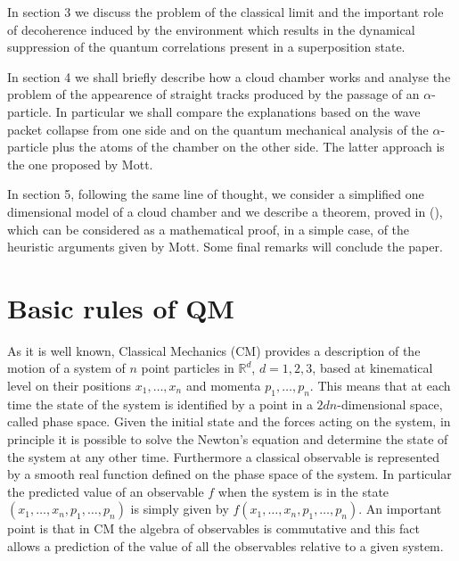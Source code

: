 \documentclass[12pt,reqno]{amsart}
\newcommand{\erre}{\mathbb{R}}
\newcommand{\n}{\relax}
\newcommand{\vs}{\medskip}
\numberwithin{equation}{section}
\begin{document}
\n
In section 3 we  discuss the problem of the classical limit and the important role of decoherence induced by the environment which results in the dynamical suppression of the quantum correlations present in a  superposition state.

\n
In section 4 we shall briefly describe how a cloud chamber works and analyse the problem of the appearence of  straight tracks produced by the passage of an $\alpha$-particle. In particular we shall compare the explanations based on the wave packet collapse from one side and on the quantum mechanical analysis of the $\alpha$-particle plus the atoms of the chamber on the other side. The latter approach is the one proposed by Mott.

\n
In section 5, following the same line of thought, we consider a simplified one dimensional model of a  cloud chamber  and  we describe  a theorem, proved in (\cite{dft}), which can be considered as a mathematical proof, in a simple case, of the heuristic arguments given by Mott. Some final remarks will conclude the paper.


\vs
\section{Basic rules of QM}

\vs
\n
As it is well known, Classical Mechanics (CM) provides a description of the motion of a system of $n$ point particles in $\erre^d$, $d=1,2,3$,   based  at kinematical level  on their positions $x_1, \ldots , x_n$ and momenta $p_1,\ldots,p_n$. 
This means that at each time the state of the system is identified by a point in a $2 d n$-dimensional space, called  phase space.
 Given the initial state and the forces acting on the system, in principle it is possible to solve the Newton's equation and determine the state  of the system  at any other time. Furthermore 
a classical observable is represented by a smooth real function defined on the phase space of the system.   In particular the predicted value of an  observable $f$ when the system is in the state $(x_1, \ldots , x_n,p_1,\ldots,p_n)$ is simply given by $f(x_1, \ldots , x_n,p_1,\ldots,p_n)$. An important point is that in CM the algebra of observables is commutative and this fact  allows a prediction  of the value of all the observables relative to a given system.
\end{document}

